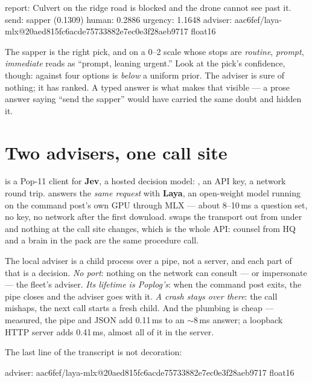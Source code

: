 \begin{repl}
report:  Culvert on the ridge road is blocked and the drone cannot
         see past it.
send:    sapper  (0.1309)
human:   0.2886
urgency: 1.1648
adviser: aac6fef/laya-mlx@20aed815fc6acde75733882e7ec0e3f28aeb9717 float16
\end{repl}

\noindent The sapper is the right pick, and  on a 0--2 scale
whose stops are \emph{routine}, \emph{prompt}, \emph{immediate} reads as
``prompt, leaning urgent.'' Look at the pick's confidence, though:
 against four options is \emph{below} a uniform prior. The
adviser is sure of nothing; it has ranked. A typed answer is what makes
that visible --- a prose answer saying ``send the sapper'' would have
carried the same doubt and hidden it.

\section{Two advisers, one call site}

 is a Pop-11 client for \textbf{Jev}, a hosted decision
model: , an API key, a network round trip.
 answers the \emph{same request} with \textbf{Laya}, an
open-weight model running on the command post's own GPU through MLX ---
about 8--10\,ms a question set, no key, no network after the first
download.  swaps the transport out from under
 and nothing at the call site changes, which is the whole
API: counsel from HQ and a brain in the pack are the same procedure call.

The local adviser is a child process over a pipe, not a server, and each
part of that is a decision. \emph{No port}: nothing on the network can
consult --- or impersonate --- the fleet's adviser. \emph{Its lifetime is
Poplog's}: when the command post exits, the pipe closes and the adviser
goes with it. \emph{A crash stays over there}: the call mishaps, the next
call starts a fresh child. And the plumbing is cheap --- measured, the pipe
and JSON add 0.11\,ms to an $\sim$8\,ms answer; a loopback HTTP server adds
0.41\,ms, almost all of it in the server.

The last line of the transcript is not decoration:

\begin{repl}
adviser: aac6fef/laya-mlx@20aed815fc6acde75733882e7ec0e3f28aeb9717 float16
\end{repl}


